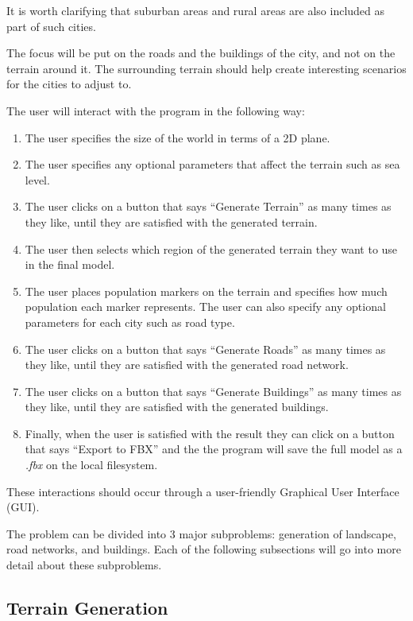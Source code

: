 It is worth clarifying that suburban areas and rural areas are also included as
part of such cities.

The focus will be put on the roads and the buildings of the city, and not on the
terrain around it. The surrounding terrain should help create interesting scenarios for the cities to adjust to.

The user will interact with the program in the following way:
\begin{enumerate}
  \item The user specifies the size of the world in terms of a 2D plane.
  \item The user specifies any optional parameters that affect the terrain
    such as sea level.
  \item The user clicks on a button that says ``Generate Terrain'' as many times
    as they like, until they are satisfied with the generated terrain.
  \item The user then selects which region of the generated terrain they want to use in the final model.
  \item The user places population markers on the terrain and specifies how much
    population each marker represents. The user can also specify any optional
    parameters for each city such as road type.
  \item The user clicks on a button that says ``Generate Roads'' as many times
    as they like, until they are satisfied with the generated road network.
  \item The user clicks on a button that says ``Generate Buildings'' as many times
    as they like, until they are satisfied with the generated buildings.
  \item Finally, when the user is satisfied with the result they can click on a
    button that says ``Export to FBX'' and the the program will save the full
    model as a \textit{.fbx} on the local filesystem.
\end{enumerate}
These interactions should occur through a user-friendly Graphical User Interface
(GUI).

The problem can be divided into 3 major subproblems: generation of landscape, road networks, and buildings.
Each of the following subsections will go into more detail about these subproblems.

\subsection{Terrain Generation}

